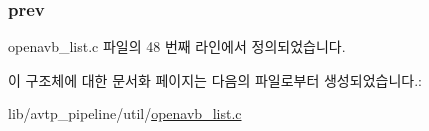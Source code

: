 \subsubsection[{\texorpdfstring{prev}{prev}}]{ prev}\hypertarget{structopenavb__list__node_ae409f1ad808ca54426757b7f342cc110}{}\label{structopenavb__list__node_ae409f1ad808ca54426757b7f342cc110}


openavb\+\_\+list.\+c 파일의 48 번째 라인에서 정의되었습니다.



이 구조체에 대한 문서화 페이지는 다음의 파일로부터 생성되었습니다.\+:\begin{DoxyCompactItemize}
\item 
lib/avtp\+\_\+pipeline/util/\hyperlink{openavb__list_8c}{openavb\+\_\+list.\+c}\end{DoxyCompactItemize}
